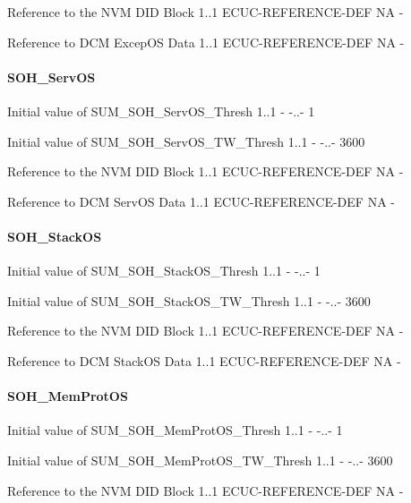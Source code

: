 {{{{{{{{{{{{{{
{Reference to the NVM DID Block}
{1..1}
{ECUC-REFERENCE-DEF}
{NA}
{-}}

{
{Reference to DCM ExcepOS Data}
{1..1}
{ECUC-REFERENCE-DEF}
{NA}
{-}}


\paragraph{SOH_ServOS}
{
{Initial value of SUM_SOH_ServOS_Thresh}
{1..1}
{-}
{-..-}
{1}}

{
{Initial value of SUM_SOH_ServOS_TW_Thresh}
{1..1}
{-}
{-..-}
{3600}}

{
{Reference to the NVM DID Block}
{1..1}
{ECUC-REFERENCE-DEF}
{NA}
{-}}

{
{Reference to DCM ServOS Data}
{1..1}
{ECUC-REFERENCE-DEF}
{NA}
{-}}

\paragraph{SOH_StackOS}
{
{Initial value of SUM_SOH_StackOS_Thresh}
{1..1}
{-}
{-..-}
{1}}

{
{Initial value of SUM_SOH_StackOS_TW_Thresh}
{1..1}
{-}
{-..-}
{3600}}

{
{Reference to the NVM DID Block}
{1..1}
{ECUC-REFERENCE-DEF}
{NA}
{-}}

{
{Reference to DCM StackOS Data}
{1..1}
{ECUC-REFERENCE-DEF}
{NA}
{-}}

\paragraph{SOH_MemProtOS}
{
{Initial value of SUM_SOH_MemProtOS_Thresh}
{1..1}
{-}
{-..-}
{1}}

{
{Initial value of SUM_SOH_MemProtOS_TW_Thresh}
{1..1}
{-}
{-..-}
{3600}}

{
{Reference to the NVM DID Block}
{1..1}
{ECUC-REFERENCE-DEF}
{NA}
{-}}

}}}}}}}}}}}}}
